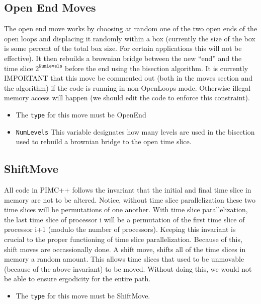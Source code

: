 \documentclass{book}
\begin{document}
\subsection{Open End Moves}
The open end move works by choosing at random one of the two open ends
of the open loops and displacing it randomly within a box (currently
the size of the box is some percent of the total box size. For certain
applications this will not be effective).  It then rebuilds a brownian
bridge between the new ``end'' and the time slice  $2^{\texttt{NumLevels}}$ before the end  using the bisection algorithm.   It is currently IMPORTANT that this move be commented out (both in the moves section and the algorithm) if the code is running in non-OpenLoops mode. Otherwise illegal memory access will happen (we should edit the code to enforce this constraint).
\begin{itemize}
\item The \texttt{type} for this move must be OpenEnd
\item \texttt{NumLevels} This variable designates how many levels are used in the bisection used to rebuild a brownian bridge to the open time slice.
\end{itemize}

\subsection{ShiftMove}
All code in PIMC++ follows the invariant that the initial and final time slice in memory are not to be altered.   Notice, without time slice parallelization these two time slices will be permutations of one another. With time slice parallelization, the last time slice of processor i will be a permutation of the first time slice of processor i+1 (modulo the number of processors).  Keeping this invariant is crucial to the proper functioning of time slice parallelization. Because of this, shift moves are occassionally done. A shift move, shifts all of the time slices in memory a random amount. This allows time slices that used to be unmovable (because of the above invariant) to be moved.  Without doing this, we would not be able to ensure ergodicity for the entire path. 
\begin{itemize}
\item The \texttt{type} for this move must be ShiftMove.
\end{itemize}
\end{document}

